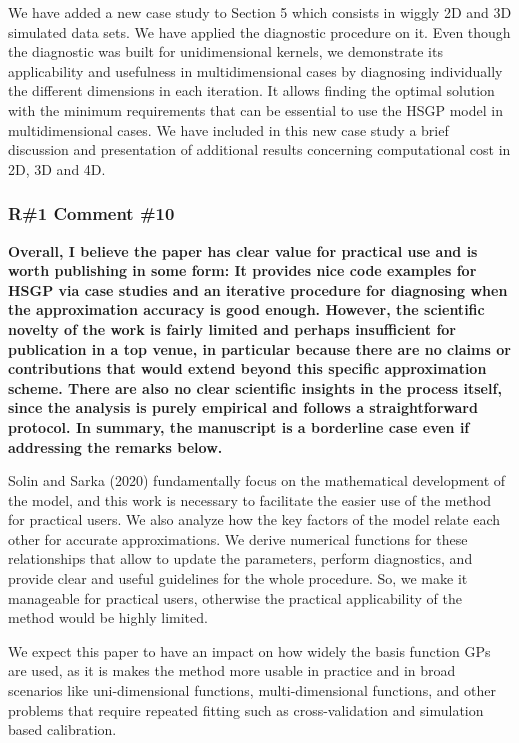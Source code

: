 \documentclass[11pt]{report}
\begin{document}
We have added a new case study to Section 5 which consists in wiggly 2D and 3D simulated data sets. We have applied the diagnostic procedure on it. Even though the diagnostic was built for unidimensional kernels, we demonstrate its applicability and usefulness in multidimensional cases by diagnosing individually the different dimensions in each iteration. It allows finding the  optimal solution with the minimum requirements that can be essential to use the HSGP model in multidimensional cases. We have included in this new case study a brief discussion and presentation of additional results concerning computational cost in 2D, 3D and 4D.

\subsubsection*{R\#1 Comment \#10}

\textbf{Overall, I believe the paper has clear value for practical use and is worth publishing in some form: It provides nice code examples for HSGP via case studies and an iterative procedure for diagnosing when the approximation accuracy is good enough. However, the scientific novelty of the work is fairly limited and perhaps insufficient for publication in a top venue, in particular because there are no claims or contributions that would extend beyond this specific approximation scheme. There are also no clear scientific insights in the process itself, since the analysis is purely empirical and follows a straightforward protocol. In summary, the manuscript is a borderline case even if addressing the remarks below.}

Solin and Sarka (2020) fundamentally focus on the mathematical development of the model, and this work is necessary to facilitate the easier use of the method for practical users. We also analyze how the key factors of the model relate each other for accurate approximations. We derive numerical functions for these relationships that allow to update the parameters, perform diagnostics, and provide clear and useful guidelines for the whole procedure. So, we make it manageable for practical users, otherwise the practical applicability of the method would be highly limited.

We expect this paper to have an impact on how widely the basis function GPs are used, as it is makes the method more usable in practice and in broad scenarios like uni-dimensional functions, multi-dimensional functions, and other problems that require repeated fitting such as cross-validation and simulation based calibration.
\end{document}
